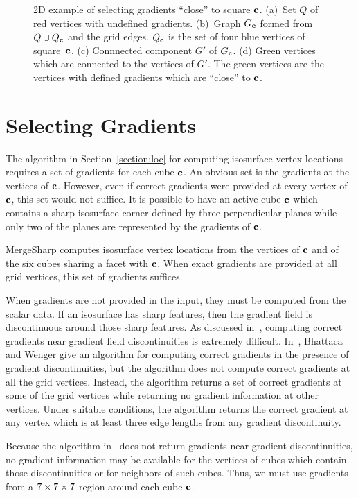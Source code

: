 \begin{figure}[t]
\caption{2D example of selecting gradients ``close'' to square $\mathbf{c}$.
(a)~Set $Q$ of red vertices with undefined gradients.
(b)~Graph $G_{\mathbf{c}}$ formed from $Q \cup Q_{\mathbf{c}}$ and the grid edges.
$Q_{\mathbf{c}}$ is the set of four blue vertices of square~$\mathbf{c}$.
(c) Connnected component $G'$ of $G_{\mathbf{c}}$.
(d) Green vertices which are connected to the vertices of $G'$.
The green vertices are the vertices with defined gradients
which are ``close'' to $\mathbf{c}$.
}
\label{fig:grad_select}
\end{figure}

\section{Selecting Gradients}
\label{section:gradients}

The algorithm in Section~\ref{section:loc}
for computing isosurface vertex locations requires
a set of gradients for each cube $\mathbf{c}$.
An obvious set is the gradients at the vertices of $\mathbf{c}$.
However, even if correct gradients were provided at every vertex of $\mathbf{c}$,
this set would not suffice.
It is possible to have an active cube $\mathbf{c}$
which contains a sharp isosurface corner
defined by three perpendicular planes
while only two of the planes are represented by the gradients of $\mathbf{c}$.

MergeSharp computes isosurface vertex locations 
from the vertices of $\mathbf{c}$ and of the six cubes sharing a facet with $\mathbf{c}$.
When exact gradients are provided at all grid vertices,
this set of gradients suffices.

When gradients are not provided in the input,
they must be computed from the scalar data.
If an isosurface has sharp features,
then the gradient field is discontinuous around those sharp features.
As discussed in~\cite{bw-isifsd-15}, 
computing correct gradients near gradient field discontinuities
is extremely difficult.
In~\cite{bw-isifsd-15},
Bhattaca and Wenger give an algorithm for computing correct gradients
in the presence of gradient discontinuities, but the algorithm does
not compute correct gradients at all the grid vertices.
Instead, the algorithm returns a set of correct gradients
at some of the grid vertices while returning no gradient information
at other vertices.
Under suitable conditions,
the algorithm returns the correct gradient at any vertex
which is at least three edge lengths from any gradient discontinuity.

Because the algorithm in~\cite{bw-isifsd-15} 
does not return gradients near gradient discontinuities,
no gradient information may be available for the vertices 
of cubes which contain those discontinuities
or for neighbors of such cubes.
Thus, we must use gradients from a $7 \times 7 \times 7$ region around each cube $\mathbf{c}$.

